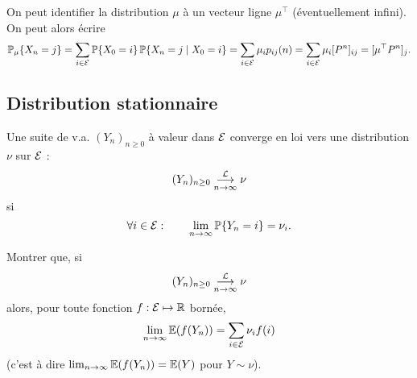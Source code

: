 \remark
On peut identifier la distribution $\mu$ à un vecteur ligne $\mu^\top$ (éventuellement infini). On peut alors écrire
$$
\operatorname{\mathbb{P}}_\mu\{X_n = j\} 
= \sum_{i \in \mathcal{E}} \operatorname{\mathbb{P}}\{X_0 = i\} \operatorname{\mathbb{P}}\{X_n = j \mid X_0 = i\}
= \sum_{i \in \mathcal{E}} \mu_i p_{ij}(n)
= \sum_{i \in \mathcal{E}} \mu_i [P^n]_{ij}
= [\mu^\top P^n]_j.
$$

\subsection{Distribution stationnaire}  

\begin{definition*}
  Une suite de v.a. $(Y_n)_{n \geq 0}$ à valeur dans $\mathcal{E}$ converge en loi vers une distribution $\nu$ sur $\mathcal{E}$ :
  $$
  (Y_n)_{n \geq 0} \overset{\mathcal{L}}{\underset{n \rightarrow \infty}{\longrightarrow}} \nu
  $$
  si
  $$
  \forall i \in \mathcal{E}: \qquad \lim_{n \rightarrow \infty} \operatorname{\mathbb{P}}\{Y_n = i\} = \nu_i.
  $$
\end{definition*}

\begin{exercise*}
  Montrer que, si
  $$
  (Y_n)_{n \geq 0} \overset{\mathcal{L}}{\underset{n \rightarrow \infty}{\longrightarrow}} \nu
  $$
  alors, pour toute fonction $f : \mathcal{E} \mapsto \mathbb{R}$ bornée, 
  $$
  \lim_{n \rightarrow \infty} \operatorname{\mathbb{E}}(f(Y_n)) = \sum_{i \in \mathcal{E}} \nu_i f(i)
  $$
  (c'est à dire $\lim_{n \rightarrow \infty} \operatorname{\mathbb{E}}(f(Y_n)) = \operatorname{\mathbb{E}}(Y)$ pour $Y \sim \nu$).
\end{exercise*}

